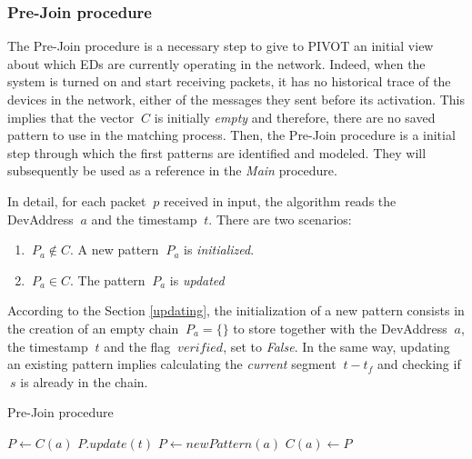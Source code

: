 \subsubsection{Pre-Join procedure}
The Pre-Join procedure is a necessary step to give to PIVOT an initial view about which EDs are currently operating in the network. Indeed, when the system is turned on and start receiving packets, it has no historical trace of the devices in the network, either of the messages they sent before its activation. This implies that the vector \(\ C \) is initially \textit{empty} and therefore, there are no saved pattern to use in the matching process. Then, the Pre-Join procedure is a initial step through which the first patterns are identified and modeled. They will subsequently be used as a reference in the \textit{Main} procedure.

\vspace{5mm}

In detail, for each packet \(\ p \) received in input, the algorithm reads the DevAddress \(\ a \) and the timestamp \(\ t \). There are two scenarios:

\vspace{3mm}
\begin{enumerate}
	\item \(\ P_{a} \notin  C\). A new pattern \(\ P_{a} \) is \textit{initialized}.
	\item \(\ P_{a} \in C\). The pattern \(\ P_{a} \) is \textit{updated}
\end{enumerate}
\vspace{3mm}

According to the Section \ref{updating}, the initialization of a new pattern consists in the creation of an empty chain \(\ P_{a} = \{\} \) to store together with the DevAddress \(\ a \), the timestamp \(\ t \) and the flag \(\ verified \), set to \textit{False}. In the same way, updating an existing pattern implies calculating the \textit{current} segment \(\ t - t_{f} \) and checking if \(\ s \) is already in the chain.

\vspace{4mm}
\begin{algorithm}
    \caption{Pre-Join procedure}
    \begin{algorithmic}[1]
            \State $P \gets C(a)$
            \State $P.update(t)$
        \Else
            \State $P \gets newPattern(a)$
            \State $C(a) \gets P$
        \EndIf
    \end{algorithmic}
\end{algorithm}
\vspace{4mm}


